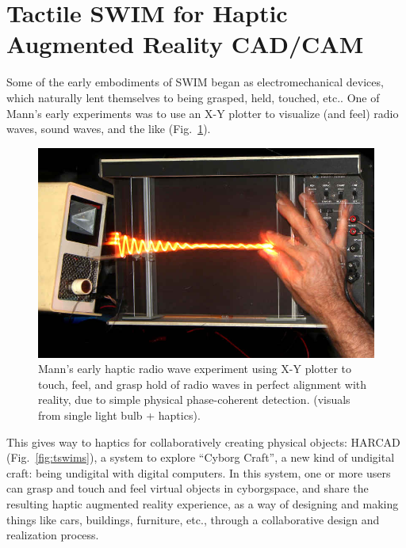 \documentclass{sigchi-ext}
\begin{document}

\section{Tactile SWIM for Haptic Augmented Reality CAD/CAM}
Some of the early embodiments of SWIM began as electromechanical devices,
which naturally lent themselves to being grasped, held, touched, etc..
One of Mann's early experiments was to use an X-Y plotter to visualize
(and feel) radio waves, sound waves, and the like
(Fig.~\ref{fig:plotter}).
\begin{figure}
  \includegraphics[width=\linewidth]{tswim_XYplotter_cp_lowres.jpg}
  \caption{Mann's early haptic radio wave experiment using X-Y plotter
           to touch, feel, and grasp hold of radio waves in perfect alignment
           with reality, due to simple physical phase-coherent detection.
 (visuals from single light bulb + haptics).
          }
  \label{fig:plotter}
\end{figure}
This gives way to haptics for collaboratively creating physical objects:
HARCAD
(Fig.~\ref{fig:tswims}),
a system to
explore ``Cyborg Craft'', a new kind of undigital craft: being undigital
with digital computers.
In this system, one or more users can grasp and touch and feel virtual
objects in cyborgspace, and share the resulting haptic augmented reality
experience, as a way of designing and making things like cars,
buildings, furniture, etc., through a collaborative design and
realization process.
\end{document}
